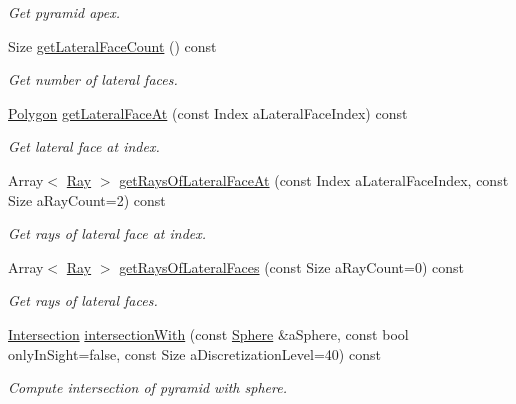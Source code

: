 \begin{DoxyCompactItemize}
\begin{DoxyCompactList}\small\item\em Get pyramid apex. \end{DoxyCompactList}\item 
Size \hyperlink{classostk_1_1math_1_1geom_1_1d3_1_1objects_1_1_pyramid_af853f40f9b9501c7fcad30337d646c4c}{get\+Lateral\+Face\+Count} () const
\begin{DoxyCompactList}\small\item\em Get number of lateral faces. \end{DoxyCompactList}\item 
\hyperlink{classostk_1_1math_1_1geom_1_1d3_1_1objects_1_1_polygon}{Polygon} \hyperlink{classostk_1_1math_1_1geom_1_1d3_1_1objects_1_1_pyramid_a5c29f2b5915fbcf7a200b49840805c86}{get\+Lateral\+Face\+At} (const Index a\+Lateral\+Face\+Index) const
\begin{DoxyCompactList}\small\item\em Get lateral face at index. \end{DoxyCompactList}\item 
Array$<$ \hyperlink{classostk_1_1math_1_1geom_1_1d3_1_1objects_1_1_ray}{Ray} $>$ \hyperlink{classostk_1_1math_1_1geom_1_1d3_1_1objects_1_1_pyramid_a798481e060dc0af1ed8ed57a75d8fa9b}{get\+Rays\+Of\+Lateral\+Face\+At} (const Index a\+Lateral\+Face\+Index, const Size a\+Ray\+Count=2) const
\begin{DoxyCompactList}\small\item\em Get rays of lateral face at index. \end{DoxyCompactList}\item 
Array$<$ \hyperlink{classostk_1_1math_1_1geom_1_1d3_1_1objects_1_1_ray}{Ray} $>$ \hyperlink{classostk_1_1math_1_1geom_1_1d3_1_1objects_1_1_pyramid_a7ead70ef5dff894a705f337dbc6cbff6}{get\+Rays\+Of\+Lateral\+Faces} (const Size a\+Ray\+Count=0) const
\begin{DoxyCompactList}\small\item\em Get rays of lateral faces. \end{DoxyCompactList}\item 
\hyperlink{classostk_1_1math_1_1geom_1_1d3_1_1_intersection}{Intersection} \hyperlink{classostk_1_1math_1_1geom_1_1d3_1_1objects_1_1_pyramid_aa971dfa1d59fcbfaf66563c6cd45bd6a}{intersection\+With} (const \hyperlink{classostk_1_1math_1_1geom_1_1d3_1_1objects_1_1_sphere}{Sphere} \&a\+Sphere, const bool only\+In\+Sight=false, const Size a\+Discretization\+Level=40) const
\begin{DoxyCompactList}\small\item\em Compute intersection of pyramid with sphere. \end{DoxyCompactList}\item 

\end{DoxyCompactItemize}
